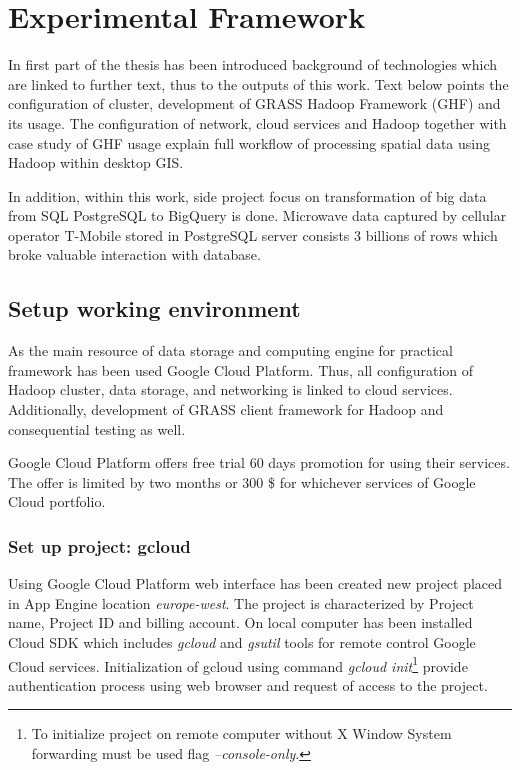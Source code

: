 \documentclass[a4paper,12pt,oneside]{report}
\begin{document}
	
	
	\newpage
	\chapter*{Experimental Framework}
	In first part of the thesis has been introduced background of technologies which are 
	linked to further text, thus to the outputs  of this work. Text below points the 
	configuration of cluster, development of GRASS Hadoop Framework (GHF) and its usage.
	The configuration of network, cloud services and Hadoop together with case study of 
	GHF usage explain full workflow of processing spatial data using Hadoop within desktop GIS.
	
	In addition, within this work, side project focus on transformation of big data from SQL
	PostgreSQL to BigQuery is done. Microwave data captured by cellular operator T-Mobile 
	stored in PostgreSQL server	consists 3 billions of rows which 
	broke valuable interaction with database.
	
	
	\section{Setup working environment}\label{setup_w_e}
	As the main resource of data storage and computing engine for practical
	framework has been used Google Cloud Platform. Thus, all configuration of Hadoop 
	cluster, data storage, and networking is linked to cloud services. Additionally,
	development of GRASS client framework for Hadoop and consequential testing  as
	well.
	
	Google Cloud Platform offers free trial 60 days promotion for using their
	services. The offer is limited by two months or 300 \$ for whichever services
	of Google Cloud portfolio.
	
	\subsection{Set up project: gcloud}\label{setup_gcloud}
	Using Google Cloud Platform web interface has been created new project placed in
	App Engine location \textit{europe-west}. The project is characterized by Project name,
	Project ID and billing account.	On local computer has been installed Cloud SDK 
	which includes \textit{gcloud} 	and \textit{gsutil} tools for remote control Google Cloud services.
	Initialization of gcloud using command \emph{gcloud init}\footnote{To initialize
	project on remote computer 	without X Window System forwarding must be used flag 
	\emph{--console-only}.}	provide authentication process using web browser 
	and request of access to the project.
	
\end{document}
